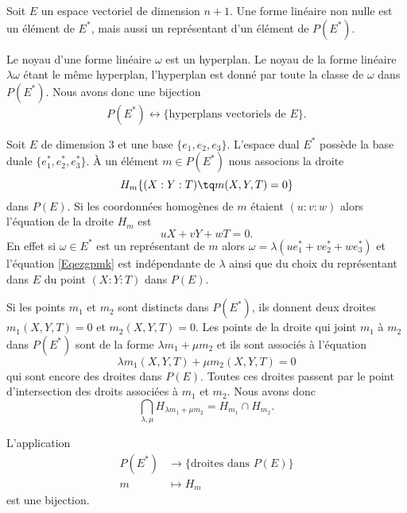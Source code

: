 Soit \( E\) un espace vectoriel de dimension \( n+1\). Une forme linéaire non nulle est un élément de \( E^*\), mais aussi un représentant d'un élément de \( P(E^*)\).

Le noyau d'une forme linéaire \( \omega\) est un hyperplan. Le noyau de la forme linéaire \( \lambda\omega\) étant le même hyperplan, l'hyperplan est donné par toute la classe de \( \omega\) dans \( P(E^*)\). Nous avons donc une bijection
\begin{equation}
    P(E^*)\leftrightarrow \{ \text{hyperplans vectoriels de } E \}.
\end{equation}

Soit \( E\) de dimension \( 3\) et une base \( \{ e_1,e_2,e_3 \}\). L'espace dual \( E^*\) possède la base duale \( \{ e_1^*,e_2^*,e_3^* \}\). À un élément \( m\in P(E^*)\) nous associons la droite
\begin{equation}
    H_m\{ (X:Y:T)\tq m(X,Y,T)=0 \}
\end{equation}
dans \( P(E)\). Si les coordonnées homogènes de \( m\) étaient \( (u:v:w)\) alors l'équation de la droite \( H_m\) est 
\begin{equation}    \label{Eqezgpmk}
    uX+vY+wT=0.
\end{equation}
En effet si \( \omega\in E^*\) est un représentant de \( m\) alors \( \omega=\lambda(ue_1^*+ve_2^*+we_3^*)\) et l'équation \eqref{Eqezgpmk} est indépendante de \( \lambda\) ainsi que du choix du représentant dans \( E\) du point \( (X:Y:T)\) dans \( P(E)\).

Si les points \( m_1\) et \( m_2\) sont distincts dans \( P(E^*)\), ils donnent deux droites \( m_1(X,Y,T)=0\) et \( m_2(X,Y,T)=0\). Les points de la droite qui joint \( m_1\) à \( m_2\) dans \( P(E^*)\) sont de la forme \( \lambda m_1+\mu m_2\) et ils sont associés à l'équation
\begin{equation}
    \lambda m_1(X,Y,T)+\mu m_2(X,Y,T)=0
\end{equation}
qui sont encore des droites dans \( P(E)\). Toutes ces droites passent par le point d'intersection des droits associées à \( m_1\) et \( m_2\). Nous avons donc
\begin{equation}
    \bigcap_{\lambda,\mu}H_{\lambda m_1+\mu m_2}=H_{m_1}\cap H_{m_2}.
\end{equation}

\begin{lemma}
    L'application
    \begin{equation}
        \begin{aligned}
            P(E^*)&\to \{ \text{droites dans } P(E) \} \\
            m&\mapsto H_m 
        \end{aligned}
    \end{equation}
    est une bijection.
\end{lemma}

